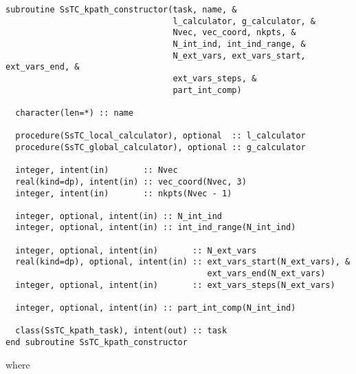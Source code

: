 \documentclass[10pt,a4paper]{article}
\begin{document}
\begin{lstlisting}[caption={Interface of the ``kpath" constructor.},captionpos=b]
subroutine SsTC_kpath_constructor(task, name, &
                                  l_calculator, g_calculator, &
                                  Nvec, vec_coord, nkpts, &
                                  N_int_ind, int_ind_range, &
                                  N_ext_vars, ext_vars_start, ext_vars_end, &
                                  ext_vars_steps, &
                                  part_int_comp)

  character(len=*) :: name

  procedure(SsTC_local_calculator), optional  :: l_calculator
  procedure(SsTC_global_calculator), optional :: g_calculator

  integer, intent(in)       :: Nvec
  real(kind=dp), intent(in) :: vec_coord(Nvec, 3)
  integer, intent(in)       :: nkpts(Nvec - 1)

  integer, optional, intent(in) :: N_int_ind
  integer, optional, intent(in) :: int_ind_range(N_int_ind)

  integer, optional, intent(in)       :: N_ext_vars
  real(kind=dp), optional, intent(in) :: ext_vars_start(N_ext_vars), &
                                         ext_vars_end(N_ext_vars)
  integer, optional, intent(in)       :: ext_vars_steps(N_ext_vars)

  integer, optional, intent(in) :: part_int_comp(N_int_ind)

  class(SsTC_kpath_task), intent(out) :: task
end subroutine SsTC_kpath_constructor
\end{lstlisting}
where
\end{document}
